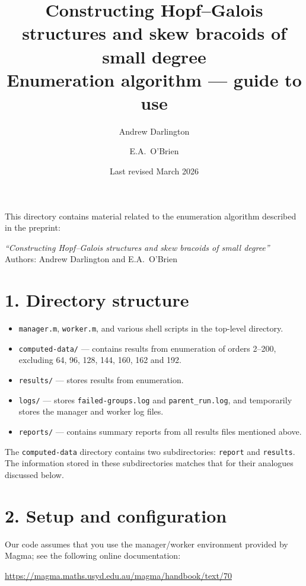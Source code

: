 \documentclass[a4paper,11pt]{article}
\title{\textbf{Constructing Hopf--Galois structures and skew bracoids of small degree}\\[0.5em]
\large Enumeration algorithm --- guide to use}
\author{Andrew Darlington \and E.A.\ O'Brien}
\date{Last revised March 2026}
\begin{document}
\maketitle

This directory contains material related to the enumeration algorithm described in the preprint:

\begin{center}
\textit{``Constructing Hopf--Galois structures and skew bracoids of small degree''}\\
Authors: Andrew Darlington and E.A.\ O'Brien
\end{center}

\section*{1. Directory structure}

\begin{itemize}[noitemsep]
    \item \texttt{manager.m}, \texttt{worker.m}, and various shell scripts in the top-level directory.
    \item \texttt{computed-data/} --- contains results from enumeration of orders 2--200, excluding 64, 96, 128, 144, 160, 162 and 192.
    \item \texttt{results/} --- stores results from enumeration.
    \item \texttt{logs/} --- stores \texttt{failed-groups.log} and \texttt{parent\_run.log}, and temporarily stores the manager and worker log files.
    \item \texttt{reports/} --- contains summary reports from all results files mentioned above.
\end{itemize}

The {\tt computed-data} directory contains two subdirectories: 
{\tt report} and {\tt results}. The information stored in these subdirectories
matches that for their analogues discussed below. 

\section*{2. Setup and configuration}

Our code assumes that you use the manager/worker environment provided by Magma; see the following online documentation:

\begin{center}
\url{https://magma.maths.usyd.edu.au/magma/handbook/text/70}
\end{center}
\end{document}
